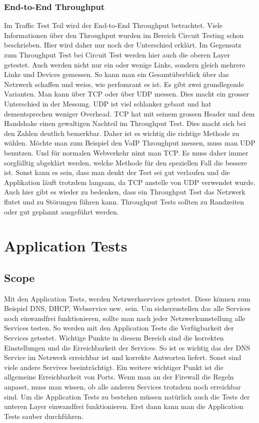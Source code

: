 \documentclass[a4,12pt]{scrartcl}
\begin{document}
\subsubsection{End-to-End Throughput}
Im Traffic Test Teil wird der End-to-End Throughput betrachtet. Viele Informationen über den Throughput wurden im Bereich Circuit Testing schon beschrieben. Hier wird daher nur noch der Unterschied erklärt.\newline
Im Gegensatz zum Throughput Test bei Circuit Test werden hier auch die oberen Layer getestet. Auch werden nicht nur ein oder wenige Links, sondern gleich mehrere Links und Devices gemessen.
So kann man ein Gesamtüberblick über das Netzwerk schaffen und weiss, wie perfomrant es ist.\newline
Es gibt zwei grundlegende Varianten. Man kann über TCP oder über UDP messen. Dies macht ein grosser Unterschied in der Messung. 
UDP ist viel schlanker gebaut und hat dementsprechen weniger Overhead. TCP hat mit seinem grossen Header und dem Handshake einen gewaltigen Nachteil im Throughput Test. Dies macht sich bei den Zahlen deutlich bemerkbar.\newline
Daher ist es wichtig die richtige Methode zu wählen.
Möchte man zum Beispiel den VoIP Throughput messen, muss man UDP benutzen. Und für normalen Webverkehr nimt man TCP. Es muss daher immer sorgfälltig abgeklärt werden, welche Methode für den speziellen Fall die bessere ist. Sonst kann es sein, dass man denkt der Test sei gut verlaufen und die Applikation läuft trotzdem langsam, da TCP anstelle von UDP verwendet wurde.\newline
Auch hier gibt es wieder zu bedenken, dass ein Throughput Test das Netzwerk flutet und zu Störungen führen kann. Throughput Tests sollten zu Randzeiten oder gut geplannt ausgeführt werden. 

\section{Application Tests}
\subsection{Scope}
Mit den Application Tests, werden Netzwerkservices getestet. Diese können zum Beispiel DNS, DHCP, Webservice usw. sein.
Um sicherzustellen das alle Services noch einwandfrei funktionieren, sollte man nach jeder Netzwerkumstellung alle Services testen. So werden mit den Application Tests die Verfügbarkeit der Services getestet.\newline
Wichtige Punkte in diesem Bereich sind die korrekten Einstellungen und die Erreichbarkeit der Services. So ist es wichtig das der DNS Service im Netzwerk erreichbar ist und korrekte Antworten liefert. Sonst sind viele andere Servives beeinträchtigt.\newline
Ein weitere wichtiger Punkt ist die allgemeine Erreichbarkeit von Ports. Wenn man an der Firewall die Regeln anpasst, muss man wissen, ob alle anderen Services trotzdem noch erreichbar sind.\newline
Um die Application Tests zu bestehen müssen natürlich auch die Tests der unteren Layer einwandfrei funktionieren. Erst dann kann man die Application Tests sauber durchführen.
\end{document}
